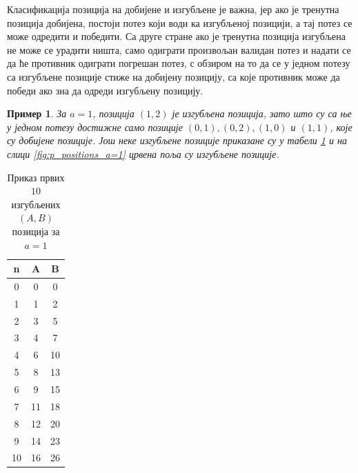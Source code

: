 \documentclass[a4paper]{article}
\newtheorem{example}{Пример}
\begin{document}
Класификација позиција на добијене и изгубљене је важна, јер ако је тренутна позиција добијена, постоји потез који води ка изгубљеној позицији, а тај потез се може одредити и победити. Са друге стране ако је тренутна позиција изгубљена не може се урадити ништа, само одиграти произвољан валидан потез и надати се да ће противник одиграти погрешан потез, с обзиром на то да се у једном потезу са изгубљене позиције стиже на добијену позицију, са које противник може да победи ако зна да одреди изгубљену позицију. 

\begin{example}
	За $ a = 1 $, позиција $ (1, 2) $ је изгубљена позиција, зато што су са ње у једном потезу достижне само позиције $ (0, 1), (0, 2), (1, 0) $ и $ (1, 1) $, које су добијене позиције. Још неке изгубљене позиције приказане су у табели \ref{tab:a_1_Ppozicije} и на слици \ref{fig:p_positions_a=1} црвена поља су изгубљене позиције. 
\end{example}
	
\begin{table}[h!]
	\caption{Приказ првих $ 10 $ изгубљених $ (A, B) $ позиција за $ a = 1 $}
	\label{tab:a_1_Ppozicije}
	\begin{center}
		\begin{tabular}{  c | c | c }
			{\textbf{n}} &  {\textbf{A}} &  {\textbf{B}} \\
			\hline
			0 & 0 & 0 \\
			1 & 1 & 2 \\
			2 & 3 & 5 \\
			3 & 4 & 7 \\
			4 & 6 & 10 \\
			5 & 8 & 13 \\
			6 & 9 & 15 \\
			7 & 11 & 18 \\
			8 & 12 & 20 \\
			9 & 14 & 23 \\
			10 & 16 & 26\\ 
		\end{tabular}
	\end{center}
\end{table}
\end{document}
